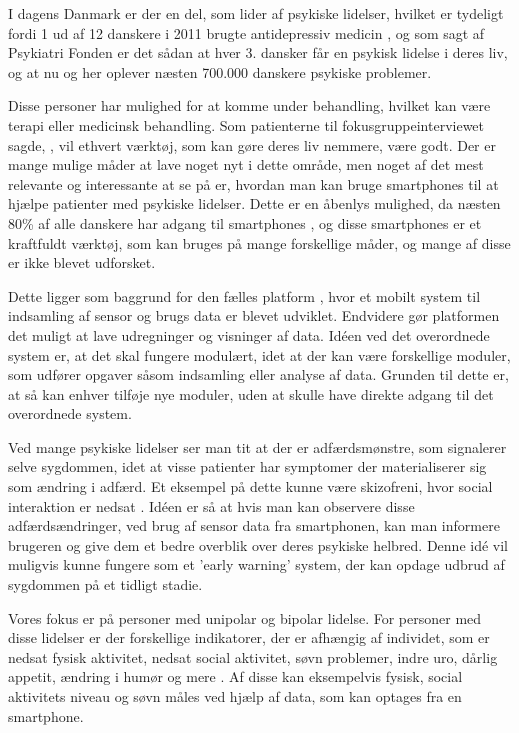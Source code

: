 I dagens Danmark er der en del, som lider af psykiske lidelser, hvilket er tydeligt fordi 1 ud af 12 danskere i 2011 brugte antidepressiv medicin \citep{misc:forbrugAntidepressiva}, og som sagt af Psykiatri Fonden er det sådan at hver 3. dansker får en psykisk lidelse i deres liv, og at nu og her oplever næsten 700.000 danskere psykiske problemer\citep{psykiatrifonden}. 

Disse personer har mulighed for at komme under behandling, hvilket kan være terapi eller medicinsk behandling.
Som patienterne til fokusgruppeinterviewet sagde, \citep[Kapitel 1, Sektion 5]{misc:faellesrapp}, vil ethvert værktøj, som kan gøre deres liv nemmere, være godt.
Der er mange mulige måder at lave noget nyt i dette område, men noget af det mest relevante og interessante at se på er, hvordan man kan bruge smartphones til at hjælpe patienter med psykiske lidelser.
Dette er en åbenlys mulighed, da næsten 80\% af alle danskere har adgang til smartphones \citep{misc:dstElektronik}, og disse smartphones er et kraftfuldt værktøj, som kan bruges på mange forskellige måder, og mange af disse er ikke blevet udforsket.

Dette ligger som baggrund for den fælles platform \citep{misc:faellesrapp}, hvor et mobilt system til indsamling af sensor og brugs data er blevet udviklet. 
Endvidere gør platformen det muligt at lave udregninger og visninger af data.
Idéen ved det overordnede system er, at det skal fungere modulært, idet at der kan være forskellige moduler, som udfører opgaver såsom indsamling eller analyse af data. 
Grunden til dette er, at så kan enhver tilføje nye moduler, uden at skulle have direkte adgang til det overordnede system.

Ved mange psykiske lidelser ser man tit at der er adfærdsmønstre, som signalerer selve sygdommen, idet at visse patienter har symptomer der materialiserer sig som ændring i adfærd.
Et eksempel på dette kunne være skizofreni, hvor social interaktion er nedsat \citep{misc:negativeSymptomsSchizo}.
Idéen er så at hvis man kan observere disse adfærdsændringer, ved brug af sensor data fra smartphonen, kan man informere brugeren og give dem et bedre overblik over deres psykiske helbred.
Denne idé vil muligvis kunne fungere som et 'early warning' system, der kan opdage udbrud af sygdommen på et tidligt stadie.

Vores fokus er på personer med unipolar og bipolar lidelse. 
For personer med disse lidelser er der forskellige indikatorer, der er afhængig af individet, som er nedsat fysisk aktivitet, nedsat social aktivitet, søvn problemer, indre uro, dårlig appetit, ændring i humør og mere \citep{misc:faellesrapp}.
Af disse kan eksempelvis fysisk, social aktivitets niveau og søvn måles ved hjælp af data, som kan optages fra en smartphone.

